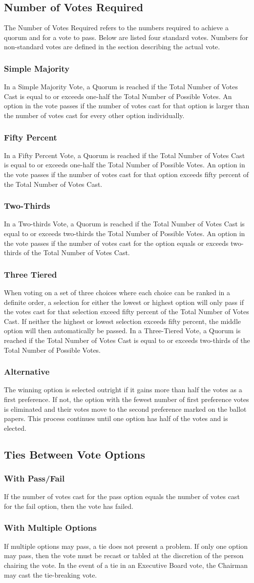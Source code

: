 \documentclass{article}
\newcommand{\asection}[1]{\subsection{#1} \label{#1}}
\newcommand{\asubsection}[1]{\subsubsection{#1} \label{#1}}
\begin{document}
\asection{Number of Votes Required}
The Number of Votes Required refers to the numbers required to achieve a quorum and for a vote to pass. Below are listed four standard votes. Numbers for non-standard votes are defined in the section describing the actual vote.
\asubsection{Simple Majority}
In a Simple Majority Vote, a Quorum is reached if the Total Number of Votes Cast is equal to or exceeds one-half the Total Number of Possible Votes. An option in the vote passes if the number of votes cast for that option is larger than the number of votes cast for every other option individually.
\asubsection{Fifty Percent}
In a Fifty Percent Vote, a Quorum is reached if the Total Number of Votes Cast is equal to or exceeds one-half the Total Number of Possible Votes. An option in the vote passes if the number of votes cast for that option exceeds fifty percent of the Total Number of Votes Cast.
\asubsection{Two-Thirds}
In a Two-thirds Vote, a Quorum is reached if the Total Number of Votes Cast is equal to or exceeds two-thirds the Total Number of Possible Votes. An option in the vote passes if the number of votes cast for the option equals or exceeds two-thirds of the Total Number of Votes Cast.
\asubsection{Three Tiered}
When voting on a set of three choices where each choice can be ranked in a definite order, a selection for either the lowest or highest option will only pass if the votes cast for that selection exceed fifty percent of the Total Number of Votes Cast. If neither the highest or lowest selection exceeds fifty percent, the middle option will then automatically be passed. In a Three-Tiered Vote, a Quorum is reached if the Total Number of Votes Cast is equal to or exceeds two-thirds of the Total Number of Possible Votes.

\asubsection{Alternative}
The winning option is selected outright if it gains more than half the votes as a first preference. If not, the option with the fewest number of first preference votes is eliminated and their votes move to the second preference marked on the ballot papers. This process continues until one option has half of the votes and is elected.

\asection{Ties Between Vote Options}
\asubsection{With Pass/Fail}
If the number of votes cast for the pass option equals the number of votes cast for the fail option, then the vote has failed.
\asubsection{With Multiple Options}
If multiple options may pass, a tie does not present a problem. If only one option may pass, then the vote must be recast or tabled at the discretion of the person chairing the vote. In the event of a tie in an Executive Board vote, the Chairman may cast the tie-breaking vote.
\end{document}
